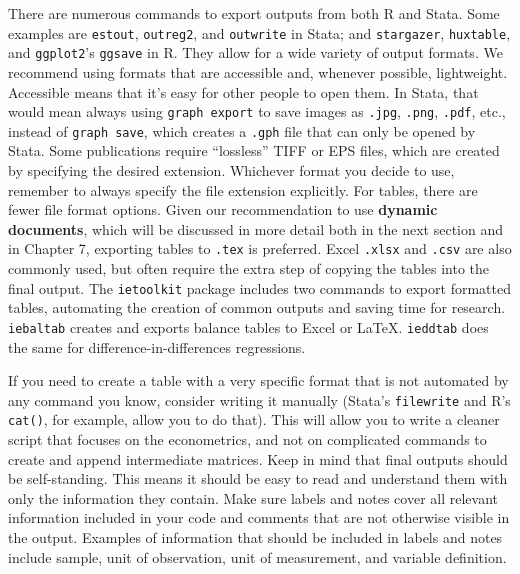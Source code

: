 There are numerous commands to export outputs from both R and Stata.
Some examples are \texttt{estout},
\texttt{outreg2},
and \texttt{outwrite} in Stata;
and \texttt{stargazer},
\texttt{huxtable},
and \texttt{ggplot2}'s \texttt{ggsave} in R.
They allow for a wide variety of output formats. 
We recommend using formats that are accessible and, whenever possible, lightweight.
Accessible means that it's easy for other people to open them.
In Stata, that would mean always using \texttt{graph export} to save images as
\texttt{.jpg}, \texttt{.png}, \texttt{.pdf}, etc.,
instead of \texttt{graph save},
which creates a \texttt{.gph} file that can only be opened by Stata.
Some publications require ``lossless'' TIFF or EPS files,
which are created by specifying the desired extension.
Whichever format you decide to use,
remember to always specify the file extension explicitly.
For tables, there are fewer file format options.
Given our recommendation to use \textbf{dynamic documents},
which will be discussed in more detail both in the next section and in Chapter 7,
exporting tables to \texttt{.tex} is preferred.
Excel \texttt{.xlsx} and \texttt{.csv} are also commonly used,
but often require the extra step of copying the tables into the final output.
The \texttt{ietoolkit} package includes two commands to export formatted tables,
automating the creation of common outputs and saving time for research.
\texttt{iebaltab} creates and exports balance tables to Excel or {\LaTeX}.
\texttt{ieddtab} does the same for difference-in-differences regressions.

If you need to create a table with a very specific format
that is not automated by any command you know, consider writing it manually
(Stata's \texttt{filewrite} and R's \texttt{cat()}, for example, allow you to do that).
This will allow you to write a cleaner script that focuses on the econometrics,
and not on complicated commands to create and append intermediate matrices.
Keep in mind that final outputs should be self-standing.
This means it should be easy to read and understand them with only the information they contain.
Make sure labels and notes cover all relevant information
included in your code and comments that are not otherwise visible in the output.
Examples of information that should be included in labels and notes include sample,
unit of observation, unit of measurement, and variable definition.

